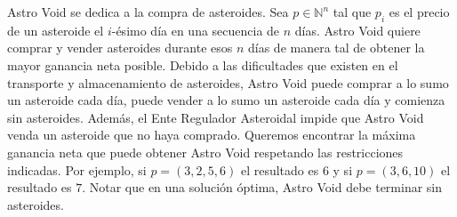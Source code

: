 
\item Astro Void se dedica a la compra de asteroides. Sea $p \in \mathbb{N}^n$ tal que $p_i$ es el precio de un asteroide el $i$-ésimo día en una secuencia de $n$ días. Astro Void quiere comprar y vender asteroides durante esos $n$ días de manera tal de obtener la mayor ganancia neta posible. Debido a las dificultades que existen en el transporte y almacenamiento de asteroides, Astro Void puede comprar a lo sumo un asteroide cada día, puede vender a lo sumo un asteroide cada día y comienza sin asteroides. Además, el Ente Regulador Asteroidal impide que Astro Void venda un asteroide que no haya comprado. Queremos encontrar la máxima ganancia neta que puede obtener Astro Void respetando las restricciones indicadas. Por ejemplo, si $p = (3, 2, 5, 6)$ el resultado es $6$ y si $p = (3,6,10)$ el resultado es $7$.  Notar que en una solución óptima, Astro Void debe terminar sin asteroides.
